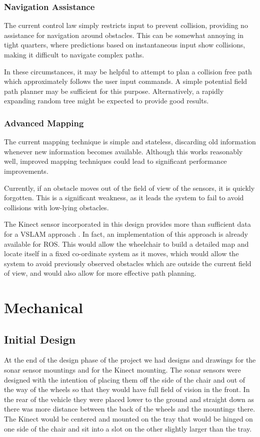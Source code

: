 \documentclass[oneside,final,a4paper]{report}
\begin{document}
\subsection{Navigation Assistance}
The current control law simply restricts input to prevent collision, providing no assistance for navigation around obstacles.  This can be somewhat annoying in tight quarters, where predictions based on instantaneous input show collisions, making it difficult to navigate complex paths.  

In these circumstances, it may be helpful to attempt to plan a collision free path which approximately follows the user input commands.  A simple potential field path planner may be sufficient for this purpose.  Alternatively, a rapidly expanding random tree might be expected to provide good results.   

\subsection{Advanced Mapping}
The current mapping technique is simple and stateless, discarding old information whenever new information becomes available.  Although this works reasonably well, improved mapping techniques could lead to significant performance improvements.  

Currently, if an obstacle moves out of the field of view of the sensors, it is quickly forgotten.  This is a significant weakness, as it leads the system to fail to avoid collisions with low-lying obstacles.

The Kinect sensor incorporated in this design provides more than sufficient data for a VSLAM approach \cite{kinect_vslam}.  In fact, an implementation of this approach is already available for ROS.  This would allow the wheelchair to build a detailed map and locate itself in a fixed co-ordinate system as it moves, which would allow the system to avoid previously observed obstacles which are outside the current field of view, and would also allow for more effective path planning.

\chapter{Mechanical}

\section{Initial Design}
At the end of the design phase of the project we had designs and drawings for the sonar sensor mountings and for the Kinect mounting. The sonar sensors were designed with the intention of placing them off the side of the chair and out of the way of the wheels so that they would have full field of vision in the front. In the rear of the vehicle they were placed lower to the ground and straight down as there was more distance between the back of the wheels and the mountings there. The Kinect would be centered and mounted on the tray that would be hinged on one side of the chair and sit into a slot on the other slightly larger than the tray.
\end{document}
